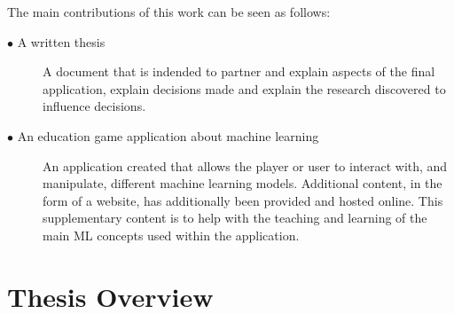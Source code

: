 		The main contributions of this work can be seen as follows:
		
		\begin{description}	
		
			\item[$\bullet$ A written thesis]\hfill
			
			A document that is indended to partner and explain aspects of the final application, explain decisions made and explain the research discovered to influence decisions. 
			
			\item[$\bullet$ An education game application about machine learning]\hfill
			
			An application created that allows the player or user to interact with, and manipulate, different machine learning models. Additional content, in the form of a website, has additionally been provided and hosted online. This supplementary content is to help with the teaching and learning of the main ML concepts used within the application.
			
			
		\end{description}
	
	\section{Thesis Overview}  
	\label{sec:intro_thesis_overview} 
	
	